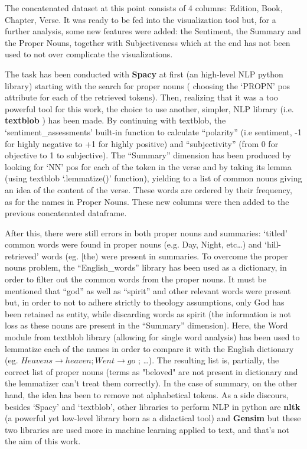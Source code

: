 \documentclass[sigchi]{article}
\begin{document}
The concatenated dataset at this point consists of 4 columns: Edition, Book, Chapter, Verse. It was ready to be fed into the visualization tool but, for a further analysis, some new features were added: the Sentiment, the Summary and the Proper Nouns, together with Subjectiveness which at the end has not been used to not over complicate the visualizations.

The task has been conducted with \textbf{Spacy} \cite{spacy} at first (an high-level NLP python library) starting with the search for proper nouns ( choosing the ‘PROPN’ pos attribute for each of the retrieved tokens). Then, realizing that it was a too powerful tool for this work,  the choice to use another, simpler, NLP library (i.e. \textbf{textblob} \cite{textblob}) has been made. By continuing with textblob, the ‘sentiment\_assessments’ built-in function to calculate “polarity” (i.e sentiment, -1 for highly negative to +1 for highly positive) and  “subjectivity” (from 0 for objective to 1 to subjective). The “Summary” dimension has been produced by looking for ‘NN’ pos for each of the token in the verse and by taking its lemma (using textblob ‘.lemmatize()’ function), yielding to a list of common nouns giving an idea of the content of the verse. These words are ordered by their frequency, as for the names in Proper Nouns.
These new columns were then added to the previous concatenated dataframe.

After this, there were still errors in both proper nouns and summaries:
‘titled’ common words were found in proper nouns (e.g. Day, Night, etc…) and ‘hill-retrieved’ words (eg. [the) were present in summaries.
To overcome the proper nouns problem, the “English\_words” library has been used as a dictionary, in order to filter out the common words from the proper nouns. It must be mentioned that “god” as well as “spirit” and other relevant words were present but, in order to not to adhere strictly to theology assumptions, only God has been retained as entity, while discarding words as spirit (the information is not loss as these nouns are present in the “Summary” dimension). Here, the Word module from textblob library (allowing for single word analysis) has been used to lemmatize each of the names in order to compare it with the English dictionary (eg. $Heavens \rightarrow heaven; Went \rightarrow go $ ; …). The resulting list is, partially, the correct list of proper nouns (terms as "beloved" are not present in dictionary and the lemmatizer can't treat them correctly).
In the case of summary, on the other hand, the idea has been to remove not alphabetical tokens.
As a side discours, besides ‘Spacy’ and ‘textblob’,  other libraries to perform NLP in python are \textbf{nltk} \cite{nltk} (a powerful yet low-level library born as a didactical tool) and \textbf{Gensim} \cite{gensim}  but these two libraries are used more in machine learning applied to text, and that’s not the aim of this work. \\ \\
\end{document}
